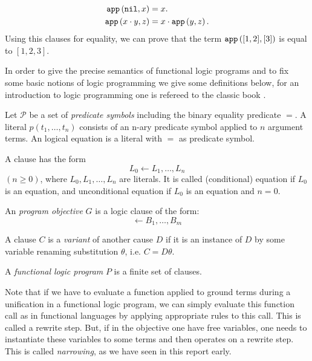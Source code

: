 \begin{align*}
    \mathtt{app}\left(\mathtt{nil},x\right) &= x. \\
    \mathtt{app}\left(x \cdot y,z\right) &= x \cdot \mathtt{app}\left(y,z\right).
\end{align*}
Using this clauses for equality, we can prove that the term $\mathtt{app}\left([1,2],[3]\right)$ is equal to $[1,2,3]$.

In order to give the precise semantics of functional logic programs and to fix some basic notions of logic programming we give some definitions below, for an introduction to logic programming one is refereed to the classic book \cite{Clocksin:1984:PP:2343}.

\begin{definition}
    Let $\mathcal{P}$ be a set of \textit{predicate symbols} including the binary equality predicate $=$. A literal $p(t_1, \dots, t_n)$ consists of an n-ary predicate symbol applied to $n$ argument terms. An logical equation is a literal with $=$ as predicate symbol.
\end{definition}

\begin{definition}
    A clause has the form
    $$L_0 \leftarrow L_1, \dots, L_n$$
    $(n \geq 0)$, where $L_0, L_1, \dots, L_n$ are literals. It is called (conditional) equation if $L_0$ is an equation, and unconditional equation if $L_0$ is an equation and $n = 0$.
\end{definition}

\begin{definition}
    An \textit{program objective} $G$ is a logic clause of the form:
    $$\leftarrow B_1, \dots, B_m$$
\end{definition}

A clause $C$ is a \textit{variant} of another cause $D$ if it is an instance of $D$ by some variable renaming substitution $\theta$, i.e. $C = D \theta$.

\begin{definition}
    A \textit{functional logic program} $P$ is a finite set of clauses.
\end{definition}

Note that if we have to evaluate a function applied to ground terms during a unification in a functional logic program, we can simply evaluate this function call as in functional languages by applying appropriate rules to this call. This is called a rewrite step. But, if in the objective one have free variables, one needs to instantiate these variables to some terms and then operates on a rewrite step. This is called \textit{narrowing}, as we have seen in this report early.

